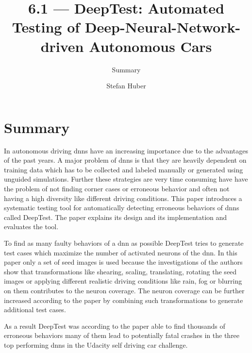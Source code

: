 \documentclass[oneside, notitlepage, twocolumn]{scrartcl}
\title{\LARGE 6.1 --- DeepTest: Automated Testing of Deep-Neural-Network-driven Autonomous Cars}
\subtitle{Summary}
\author{Stefan Huber}
\begin{document}
\maketitle

\section{Summary}
In autonomous driving \glspl{dnn} have an increasing importance due to the advantages of the past years.
A major problem of \glspl{dnn} is that they are heavily dependent on training data which has to be collected and labeled manually or generated using unguided simulations.
Further these strategies are very time consuming have have the problem of not finding corner cases or erroneous behavior and often not having a high diversity like different driving conditions.
This paper introduces a systematic testing tool for automatically detecting erroneous behaviors of \glspl{dnn} called DeepTest.
The paper explains its design and its implementation and evaluates the tool.\par
To find as many faulty behaviors of a \gls{dnn} as possible DeepTest tries to generate test cases which maximize the number of activated neurons of the \gls{dnn}.
In this paper only a set of seed images is used because the investigations of the authors show that transformations like shearing, scaling, translating, rotating the seed images or applying different realistic driving conditions like rain, fog or blurring on them contributes to the neuron coverage.
The neuron coverage can be further increased according to the paper by combining such transformations to generate additional test cases.\par
As a result DeepTest was according to the paper able to find thousands of erroneous behaviors many of them lead to potentially fatal crashes in the three top performing \glspl{dnn} in the Udacity self driving car challenge.
\end{document}
